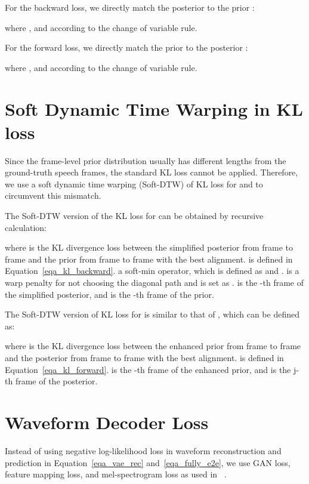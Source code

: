 \documentclass{article}
\theoremstyle{definition}
\begin{document}
For the backward loss, we directly match the posterior  to the prior :

where , and  according to the change of variable rule. 

For the forward loss, we directly match the prior  to the posterior :

where , and  according to the change of variable rule.





\section{Soft Dynamic Time Warping in KL loss}
\label{appendix_soft_dtw}

Since the frame-level prior distribution  usually has different lengths from the ground-truth speech frames, the standard KL loss cannot be applied. Therefore, we use a soft dynamic time warping (Soft-DTW) of KL loss for  and  to circumvent this mismatch.

The Soft-DTW version of the KL loss for  can be obtained by recursive calculation:

where  is the KL divergence loss between the simplified posterior  from frame  to frame  and the prior  from frame  to frame  with the best alignment.  is defined in Equation~\ref{eqa_kl_backward}.  a soft-min operator, which is defined as  and .  is a warp penalty for not choosing the diagonal path and is set as .  is the -th frame of the simplified posterior, and  is the -th frame of the prior.

The Soft-DTW version of KL loss for  is similar to that of , which can be defined as:

where  is the KL divergence loss between the enhanced prior  from frame  to frame  and the posterior  from frame  to frame  with the best alignment.  is defined in Equation~\ref{eqa_kl_forward}.  is the -th frame of the enhanced prior, and  is the j-th frame of the posterior.





\section{Waveform Decoder Loss}
\label{appendix_wav_dec_loss}

Instead of using negative log-likelihood loss in waveform reconstruction and prediction in Equation~\ref{eqa_vae_rec} and~\ref{eqa_fully_e2e}, we use GAN loss, feature mapping loss, and mel-spectrogram loss as used in ~\citep{kong2020hifi}.
\end{document}
